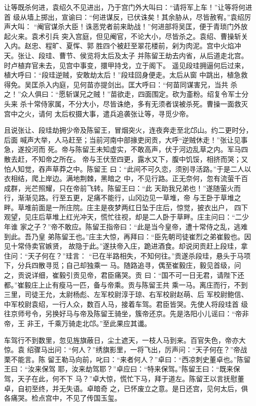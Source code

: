 让等既杀何进，袁绍久不见进出，乃于宫门外大叫曰：“请将军上车！”让等将何进首
级从墙上掷出，宣谕曰：“何进谋反，已伏诛矣！其余胁从，尽皆赦宥。”袁绍厉声大叫：
“阉官谋杀大臣！诛恶党者前来助战！”何进部将吴匡，便于青琐门外放起火来。袁术引兵
突入宫庭，但见阉官，不论大小，尽皆杀之。袁绍、曹操斩关入内。赵忠、程旷、夏恽、郭
胜四个被赶至翠花楼前，剁为肉泥。宫中火焰冲天。张让、段珪、曹节、侯览将太后及太子
并陈留王劫去内省，从后道走北宫。时卢植弃官未去，见宫中事变，擐甲持戈，立于阁下。
遥见段珪拥逼何后过来，植大呼曰：“段珪逆贼，安敢劫太后！”段珪回身便走。太后从窗
中跳出，植急救得免。吴匡杀入内庭，见何苗亦提剑出。匡大呼曰：“何苗同谋害兄，当共
杀之！”众人俱曰：“愿斩谋兄之贼！”苗欲走，四面围定。砍为齑粉。绍复令军士分头来
杀十常侍家属，不分大小，尽皆诛绝，多有无须者误被杀死。曹操一面救灭宫中之火，请何
太后权摄大事，遣兵追袭张让等，寻觅少帝。

且说张让、段珪劫拥少帝及陈留王，冒烟突火，连夜奔走至北邙山。约二更时分，后面
喊声大举，人马赶至；当前河南中部掾吏闵贡，大呼“逆贼休走！”张让见事急，遂投河而
死。帝与陈留王未知虚实，不敢高声，伏于河边乱草之内。军马四散去赶，不知帝之所在。
帝与王伏至四更，露水又下，腹中饥馁，相挤而哭；又怕人知觉，吞声草莽之中。陈留王
曰：“此间不可久恋，须别寻活路。”于是二人以衣相结，爬上岸边。满地荆棘，黑暗之
中，不见行路。正无奈何，忽有流萤千百成群，光芒照耀，只在帝前飞转。陈留王曰：“此
天助我兄弟也！”遂随萤火而行，渐渐见路。行至五更，足痛不能行，山冈边见一草堆，帝
与王卧于草堆之畔。草堆前面是一所庄院。庄主是夜梦两红日坠于庄后，惊觉，披衣出户，
四下观望，见庄后草堆上红光冲天，慌忙往视，却是二人卧于草畔。庄主问曰：“二少年谁
家之子？”帝不敢应。陈留王指帝曰：“此是当今皇帝，遭十常侍之乱，逃难到此。吾乃皇
弟陈留王也。”庄主大惊，再拜曰：“臣先朝司徒崔烈之弟崔毅也。因见十常侍卖官嫉贤，
故隐于此。”遂扶帝入庄，跪进酒食。却说闵贡赶上段珪，拿住问：“天子何在？”珪言：
“已在半路相失，不知何往。”贡遂杀段珪，悬头于马项下，分兵四散寻觅；自己却独乘一
马。随路追寻，偶至崔毅庄，毅见首级，问之，贡说详细，崔毅引贡见帝，君臣痛哭。贡
曰：“国不可一日无君，请陛下还都。”崔毅庄上止有瘦马一匹，备与帝乘。贡与陈留王共
乘一马。离庄而行，不到三里，司徒王允，太尉杨彪、左军校尉淳于琼、右军校尉赵萌、后
军校尉鲍信、中军校尉袁绍，一行人众，数百人马，接着车驾。君臣皆哭。先使人将段珪首
级往京师号令，另换好马与帝及陈留王骑坐，簇帝还京。先是洛阳小儿谣曰：“帝非帝，王
非王，千乘万骑走北邙。”至此果应其谶。

车驾行不到数里，忽见旌旗蔽日，尘土遮天，一枝人马到来。百官失色，帝亦大惊。袁
绍骤马出问：“何人？”绣旗影里，一将飞出，厉声问：“天子何在？”帝战栗不能言。陈
留王勒马向前，叱曰：“来者何人？”卓曰：“西凉刺史董卓也。”陈留王曰：“汝来保驾
耶，汝来劫驾耶？”卓应曰：“特来保驾。”陈留王曰：“既来保驾，天子在此，何不下
马？”卓大惊，慌忙下马，拜于道左。陈留王以言抚慰董卓，自初至终，并无失语。卓暗奇
之，已怀废立之意。是日还宫，见何太后，俱各痛哭。检点宫中，不见了传国玉玺。

